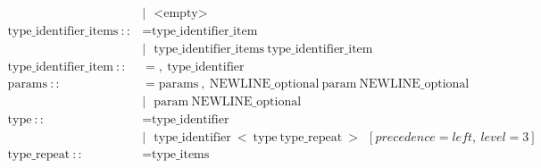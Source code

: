 \documentclass{article}
\begin{document}
\begin{align*}
                                      & |\ \ \ \text{<empty>}                                                                                                                                                                                                     \\
  \text{type\_identifier\_items}\ ::  & = \text{type\_identifier\_item}                                                                                                                                                                                           \\
                                      & |\ \ \ \text{type\_identifier\_items}\ \text{type\_identifier\_item}                                                                                                                                                      \\
  \text{type\_identifier\_item}\ ::   & = ,\ \text{type\_identifier}                                                                                                                                                                                              \\
  \text{params}\ ::                   & = \text{params}\ ,\ \text{NEWLINE\_optional}\ \text{param}\ \text{NEWLINE\_optional}                                                                                                                                      \\
                                      & |\ \ \ \text{param}\ \text{NEWLINE\_optional}                                                                                                                                                                             \\
  \text{type}\ ::                     & = \text{type\_identifier}                                                                                                                                                                                                 \\
                                      & |\ \ \ \text{type\_identifier}\ <\ \text{type}\ \text{type\_repeat}\ >\ \ [precedence=left,\ level=3]                                                                                                                     \\
  \text{type\_repeat}\ ::             & = \text{type\_items}                                                                                                                                                                                                      \\

\end{align*}
\end{document}
